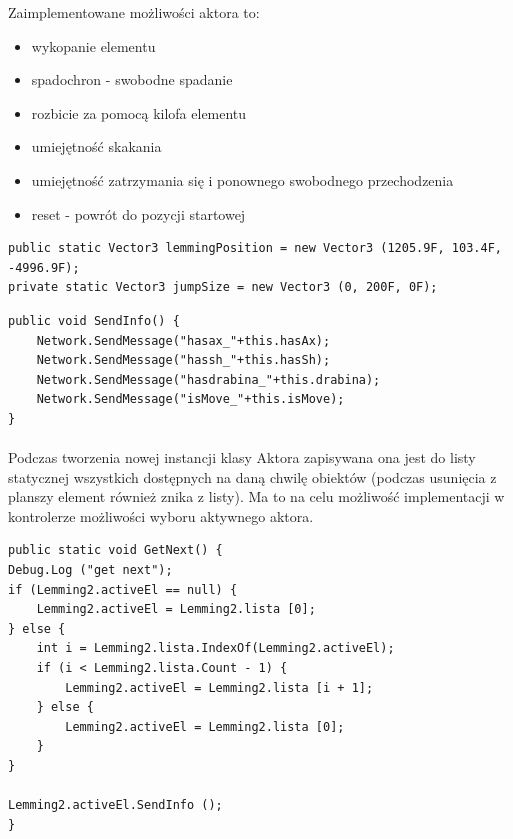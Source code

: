 Zaimplementowane możliwości aktora to:

\begin{itemize}
	\item wykopanie elementu
	\item spadochron - swobodne spadanie
	\item rozbicie za pomocą kilofa elementu
	\item umiejętność skakania
	\item umiejętność zatrzymania się i ponownego swobodnego przechodzenia
	\item reset - powrót do pozycji startowej
\end{itemize}

\begin{lstlisting}[language=CSharp]
public static Vector3 lemmingPosition = new Vector3 (1205.9F, 103.4F, -4996.9F);
private static Vector3 jumpSize = new Vector3 (0, 200F, 0F);
\end{lstlisting}

\begin{lstlisting}[language=CSharp]
public void SendInfo() {
	Network.SendMessage("hasax_"+this.hasAx);
	Network.SendMessage("hassh_"+this.hasSh);
	Network.SendMessage("hasdrabina_"+this.drabina);
	Network.SendMessage("isMove_"+this.isMove);
}
\end{lstlisting}

\paragraph{}
Podczas tworzenia nowej instancji klasy Aktora zapisywana ona jest do listy statycznej wszystkich dostępnych na daną chwilę obiektów (podczas usunięcia z planszy element również znika z listy). Ma to na celu możliwość implementacji w kontrolerze możliwości wyboru aktywnego aktora.

\begin{lstlisting}[language=CSharp]
public static void GetNext() {
Debug.Log ("get next");
if (Lemming2.activeEl == null) {
	Lemming2.activeEl = Lemming2.lista [0];
} else {
	int i = Lemming2.lista.IndexOf(Lemming2.activeEl);
	if (i < Lemming2.lista.Count - 1) {
		Lemming2.activeEl = Lemming2.lista [i + 1];
	} else {
		Lemming2.activeEl = Lemming2.lista [0];
	}
}

Lemming2.activeEl.SendInfo ();
}
\end{lstlisting}

